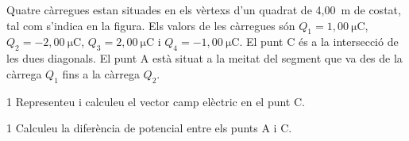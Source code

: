 Quatre càrregues estan situades en els vèrtexs d'un quadrat de 4,00~m de costat, tal com s'indica en la figura. Els valors de les càrregues són $Q_1 = 1,00\ \mathrm{\mu C}$, $Q_2 = -2,00\ \mathrm{\mu C}$, $Q_3 = 2,00\ \mathrm{\mu C}$ i $Q_4 = -1,00\ \mathrm{\mu C}$. El punt C és a la intersecció de les dues diagonals. El punt A està situat a la meitat del segment que va des de la càrrega $Q_1$ fins a la càrrega $Q_2$.


\begin{apartat}{1}
Representeu i calculeu el vector camp elèctric en el punt C.
\end{apartat}

\begin{apartat}{1}
Calculeu la diferència de potencial entre els punts A i C.
\end{apartat}

